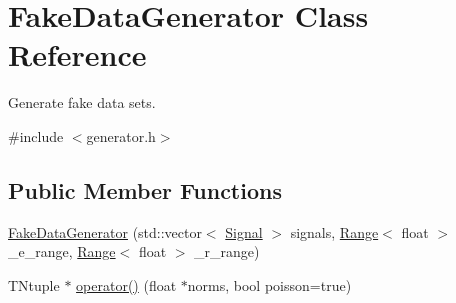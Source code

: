 \hypertarget{classFakeDataGenerator}{
\section{FakeDataGenerator Class Reference}
\label{classFakeDataGenerator}
}


Generate fake data sets.  




{\ttfamily \#include $<$generator.h$>$}

\subsection*{Public Member Functions}
\begin{DoxyCompactItemize}
\item 
\hyperlink{classFakeDataGenerator_a0ae60cc103b8b536fbccdfaddf393cbc}{FakeDataGenerator} (std::vector$<$ \hyperlink{structSignal}{Signal} $>$ signals, \hyperlink{structRange}{Range}$<$ float $>$ \_\-e\_\-range, \hyperlink{structRange}{Range}$<$ float $>$ \_\-r\_\-range)
\item 
TNtuple $\ast$ \hyperlink{classFakeDataGenerator_ab1084f63fb6a96cf9fc4d4cf12a39384}{operator()} (float $\ast$norms, bool poisson=true)
\end{DoxyCompactItemize}
